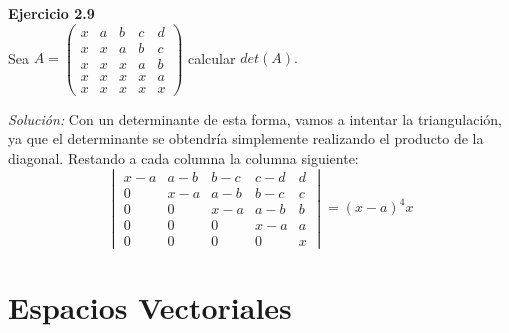 \documentclass{article}
\newenvironment{problem}[2][Ejercicio]
    { \begin{mdframed}[backgroundcolor=gray!20] \textbf{#1 #2} \\}
    {  \end{mdframed}}
\newenvironment{solution}
    {\textit{Solución:}}
    {}
\begin{document}
\begin{problem}{2.9}
    Sea $A =  \begin{pmatrix} x & a & b & c & d \\ x & x & a & b & c \\ x & x & x & a & b \\  x & x & x & x & a \\ x & x & x & x & x \end{pmatrix}$ calcular $det(A).$
\end{problem}
\begin{solution}
    Con un determinante de esta forma, vamos a intentar la triangulación, ya que el determinante se obtendría simplemente realizando el producto de la diagonal.
Restando a cada columna la columna siguiente:
\[
\begin{vmatrix} x-a & a-b & b-c & c-d & d \\ 0 & x-a & a-b & b-c & c \\ 0 & 0 & x-a & a-b & b \\  0 & 0 & 0 & x-a & a \\ 0 & 0 & 0 & 0 & x \end{vmatrix} = (x-a)^4x
\]
\end{solution}

\section{Espacios Vectoriales}\label{sec:esp-vectoriales}
\end{document}
